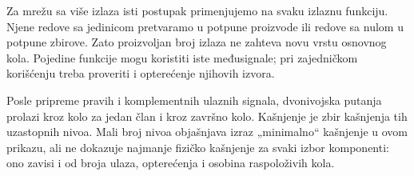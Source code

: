 Za mrežu sa više izlaza isti postupak primenjujemo na svaku izlaznu funkciju. Njene redove sa jedinicom pretvaramo u potpune proizvode ili redove sa nulom u potpune zbirove. Zato proizvoljan broj izlaza ne zahteva novu vrstu osnovnog kola. Pojedine funkcije mogu koristiti iste međusignale; pri zajedničkom korišćenju treba proveriti i opterećenje njihovih izvora.

Posle pripreme pravih i komplementnih ulaznih signala, dvonivojska putanja prolazi kroz kolo za jedan član i kroz završno kolo. Kašnjenje je zbir kašnjenja tih uzastopnih nivoa. Mali broj nivoa objašnjava izraz „minimalno“ kašnjenje u ovom prikazu, ali ne dokazuje najmanje fizičko kašnjenje za svaki izbor komponenti: ono zavisi i od broja ulaza, opterećenja i osobina raspoloživih kola.
